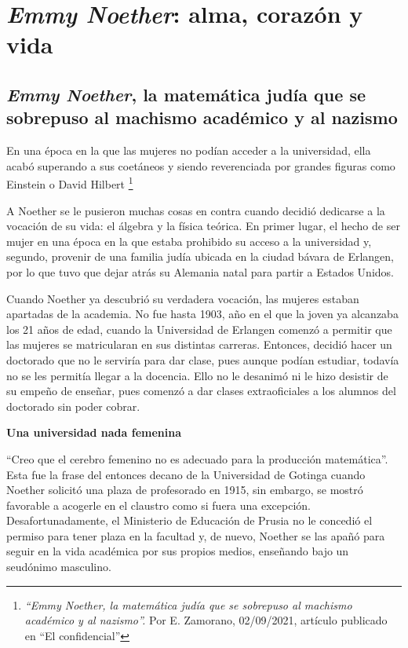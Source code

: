 
\chapter{\emph{Emmy Noether}: alma, corazón y vida}

\section [\emph{Emmy Noether}, la matemática judía que se sobrepuso al machismo académico y al nazismo]{\emph{Emmy Noether}, la matemática judía que se sobrepuso al machismo académico y al nazismo}

\begin{small} 
En una época en la que las mujeres no podían acceder a la universidad, ella acabó superando a sus coetáneos y siendo reverenciada por grandes figuras como Einstein o David Hilbert 
\footnote{\emph{``Emmy Noether, la matemática judía que se sobrepuso al machismo académico y al nazismo''.} Por E. Zamorano, 02/09/2021, artículo publicado en ``El confidencial''}


A Noether se le pusieron muchas cosas en contra cuando decidió dedicarse a la vocación de su vida: el álgebra y la física teórica. En primer lugar, el hecho de ser mujer en una época en la que estaba prohibido su acceso a la universidad y, segundo, provenir de una familia judía ubicada en la ciudad bávara de Erlangen, por lo que tuvo que dejar atrás su Alemania natal para partir a Estados Unidos.


Cuando Noether ya descubrió su verdadera vocación, las mujeres estaban apartadas de la academia. No fue hasta 1903, año en el que la joven ya alcanzaba los 21 años de edad, cuando la Universidad de Erlangen comenzó a permitir que las mujeres se matricularan en sus distintas carreras. Entonces, decidió hacer un doctorado que no le serviría para dar clase, pues aunque podían estudiar, todavía no se les permitía llegar a la docencia. Ello no le desanimó ni le hizo desistir de su empeño de enseñar, pues comenzó a dar clases extraoficiales a los alumnos del doctorado sin poder cobrar. 

\textbf{Una universidad nada femenina} 

``Creo que el cerebro femenino no es adecuado para la producción matemática''. Esta fue la frase del entonces decano de la Universidad de Gotinga cuando Noether solicitó una plaza de profesorado en 1915, sin embargo, se mostró favorable a acogerle en el claustro como si fuera una excepción. Desafortunadamente, el Ministerio de Educación de Prusia no le concedió el permiso para tener plaza en la facultad y, de nuevo, Noether se las apañó para seguir en la vida académica por sus propios medios, enseñando bajo un seudónimo masculino. 


\end{small}
